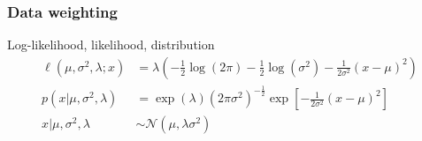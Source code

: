 \documentclass{beamer}
\begin{document}

\begin{frame}
\frametitle{Data weighting}
Log-likelihood, likelihood, distribution
\begin{align*}
  \ell (\mu, \sigma^2, \lambda; x) &= \lambda \left( -\frac{1}{2} \log (2 \pi) - \frac{1}{2}
  \log (\sigma^2) - \frac{1}{2 \sigma^2} (x - \mu)^2 \right)\\
  p(x|\mu, \sigma^2, \lambda) &= \exp(\lambda) \left( 2 \pi \sigma^2 \right)^{-\frac{1}{2}} \exp \left[ -\frac{1}{2
      \sigma^2} (x - \mu)^2 \right]\\
  x|\mu, \sigma^2, \lambda &\sim \mathcal{N} \left( \mu, \lambda \sigma^2 \right)
\end{align*}
\end{frame}

\end{document}
